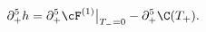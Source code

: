 \begin{equation}\label{hFC}
 \partial_+^5 h=\partial_+^5\cF^{(1)}\big|_{T_{-}=0}-\partial_+^5 \C(T_{+}).
\end{equation}

